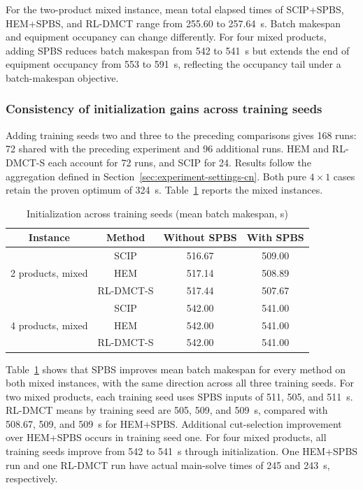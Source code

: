 \documentclass[final,5p,times,twocolumn]{elsarticle}
\begin{document}
For the two-product mixed instance, mean total elapsed times of SCIP+SPBS, HEM+SPBS, and RL-DMCT range from 255.60 to 257.64~s. Batch makespan and equipment occupancy can change differently. For four mixed products, adding SPBS reduces batch makespan from 542 to 541~s but extends the end of equipment occupancy from 553 to 591~s, reflecting the occupancy tail under a batch-makespan objective.

\subsubsection{Consistency of initialization gains across training seeds}
\label{sec:journal-training-cn}
Adding training seeds two and three to the preceding comparisons gives 168 runs: 72 shared with the preceding experiment and 96 additional runs. HEM and RL-DMCT-S each account for 72 runs, and SCIP for 24. Results follow the aggregation defined in Section~\ref{sec:experiment-settings-cn}. Both pure $4\times1$ cases retain the proven optimum of 324~s. Table~\ref{tab:journal-training-cn} reports the mixed instances.


\begin{table}[!htbp]
\centering\small
\caption{Initialization across training seeds (mean batch makespan, s)}
\label{tab:journal-training-cn}
\setlength{\tabcolsep}{5pt}
\begin{tabular}{cccc}\toprule
Instance & Method & Without SPBS & With SPBS\\\midrule
\multirow[c]{3}{*}{2 products, mixed} & SCIP & 516.67 & 509.00\\
 & HEM & 517.14 & 508.89\\
 & RL-DMCT-S & 517.44 & 507.67\\
\multirow[c]{3}{*}{4 products, mixed} & SCIP & 542.00 & 541.00\\
 & HEM & 542.00 & 541.00\\
 & RL-DMCT-S & 542.00 & 541.00\\
\bottomrule\end{tabular}
\end{table}


Table~\ref{tab:journal-training-cn} shows that SPBS improves mean batch makespan for every method on both mixed instances, with the same direction across all three training seeds. For two mixed products, each training seed uses SPBS inputs of 511, 505, and 511~s. RL-DMCT means by training seed are 505, 509, and 509~s, compared with 508.67, 509, and 509~s for HEM+SPBS. Additional cut-selection improvement over HEM+SPBS occurs in training seed one. For four mixed products, all training seeds improve from 542 to 541~s through initialization. One HEM+SPBS run and one RL-DMCT run have actual main-solve times of 245 and 243~s, respectively.
\end{document}
